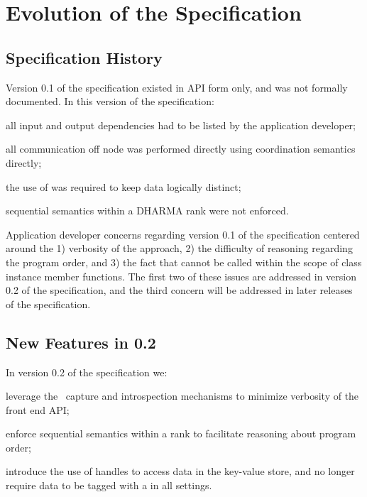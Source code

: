 \chapter{Evolution of the Specification}
\label{chap:evolution}
\section{Specification History}
\label{sec:past}
Version 0.1 of the specification existed in \gls{API} form only, and was not
formally documented.  In this version of the specification:
\begin{compactenum}
\item all input and output dependencies had to be listed by the application
developer;
\item all communication off node was
performed directly using \gls{coordination semantics} directly;
\item  the use of  was required to keep data
logically distinct;
\item \gls{sequential semantics} within a DHARMA rank were not enforced.
\end{compactenum}

 Application developer concerns regarding version 0.1 of the specification
 centered around the 1) verbosity of the approach, 2) the difficulty of
 reasoning regarding the program order, and 3) the fact that 
  cannot be called
 within the scope of class instance member functions.  The first two of these issues are
   addressed in version 0.2 of the specification, and the third concern will be
   addressed in later releases of the specification.
   


\section{New Features in 0.2}
\label{sec:current}
In version 0.2 of the specification we:
  \begin{compactenum}
\item leverage the \CC\ \gls{capture} and
    \gls{introspection} mechanisms to minimize verbosity of the \gls{front end}
    \gls{API};  
\item enforce \gls{sequential semantics} within a \gls{rank} to
    facilitate reasoning about program order; 
\item introduce the use of
    \glspl{handle} to access data in the \gls{key-value store}, and no longer
    require data to be tagged with a  in all
    settings.
    \end{compactenum}


